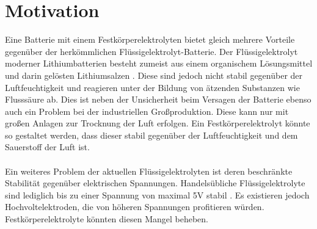 \documentclass[a4paper, 11pt, headsepline,footsepline,twoside,abstract]{scrbook}
\begin{document}
\section{Motivation}
Eine Batterie mit einem Festkörperelektrolyten bietet gleich mehrere Vorteile gegenüber der herkömmlichen Flüssigelektrolyt-Batterie. Der Flüssigelektrolyt moderner Lithiumbatterien besteht zumeist aus einem organischem Lösungsmittel und darin gelösten Lithiumsalzen \cite{xu2004nonaqueous}. Diese sind jedoch nicht stabil gegenüber der Luftfeuchtigkeit und reagieren unter der Bildung von ätzenden Substanzen wie Flusssäure ab. Dies ist neben der Unsicherheit beim Versagen der Batterie ebenso auch ein Problem bei der industriellen Großproduktion. Diese kann nur mit großen Anlagen zur Trocknung der Luft erfolgen. Ein Festkörperelektrolyt könnte so gestaltet werden, dass dieser stabil gegenüber der Luftfeuchtigkeit und dem Sauerstoff der Luft ist.
\\\\
Ein weiteres Problem der aktuellen Flüssigelektrolyten ist deren beschränkte Stabilität gegenüber elektrischen Spannungen. Handelsübliche Flüssigelektrolyte sind lediglich bis zu einer Spannung von maximal 5V stabil \cite{tarascon1994new}. Es existieren jedoch Hochvoltelektroden, die von höheren Spannungen profitieren würden. Festkörperelektrolyte könnten diesen Mangel beheben.
\end{document}
